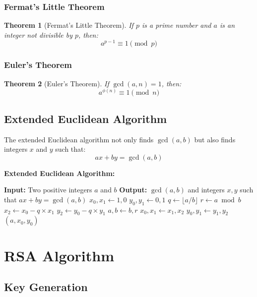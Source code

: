 \documentclass[11pt,a4paper]{article}
\newtheorem{theorem}{Theorem}[section]
\begin{document}
\subsubsection{Fermat's Little Theorem}

\begin{theorem}[Fermat's Little Theorem]
If $p$ is a prime number and $a$ is an integer not divisible by $p$, then:
$$a^{p-1} \equiv 1 \pmod{p}$$
\end{theorem}

\subsubsection{Euler's Theorem}

\begin{theorem}[Euler's Theorem]
If $\gcd(a,n) = 1$, then:
$$a^{\phi(n)} \equiv 1 \pmod{n}$$
\end{theorem}

\subsection{Extended Euclidean Algorithm}

The extended Euclidean algorithm not only finds $\gcd(a,b)$ but also finds integers $x$ and $y$ such that:
$$ax + by = \gcd(a,b)$$

\begin{mathbox}
\textbf{Extended Euclidean Algorithm:}
\begin{algorithmic}
\STATE \textbf{Input:} Two positive integers $a$ and $b$
\STATE \textbf{Output:} $\gcd(a,b)$ and integers $x, y$ such that $ax + by = \gcd(a,b)$
\STATE $x_0, x_1 \leftarrow 1, 0$
\STATE $y_0, y_1 \leftarrow 0, 1$
    \STATE $q \leftarrow \lfloor a/b \rfloor$
    \STATE $r \leftarrow a \bmod b$
    \STATE $x_2 \leftarrow x_0 - q \times x_1$
    \STATE $y_2 \leftarrow y_0 - q \times y_1$
    \STATE $a, b \leftarrow b, r$
    \STATE $x_0, x_1 \leftarrow x_1, x_2$
    \STATE $y_0, y_1 \leftarrow y_1, y_2$
\ENDWHILE
\RETURN $(a, x_0, y_0)$
\end{algorithmic}
\end{mathbox}

\section{RSA Algorithm}

\subsection{Key Generation}
\end{document}
